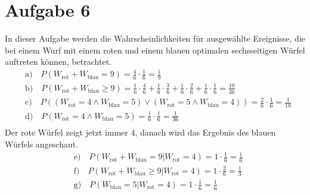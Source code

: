 \documentclass[a4paper, 11pt]{article}
\begin{document}
\section*{Aufgabe 6}
In dieser Aufgabe werden die Wahrscheinlichkeiten für ausgewählte Ereignisse, die
bei einem Wurf mit einem roten und einem blauen optimalen sechsseitigen Würfel
auftreten können, betrachtet.
\begin{align*}
  &\text{a)} \quad
  P(W_\text{rot}+W_\text{blau}=9) = \frac{4}{6} \cdot \frac{1}{6} = \frac{1}{9} \\
  &\text{b)} \quad
  P(W_\text{rot}+W_\text{blau}\ge9) = \frac{1}{6} \cdot \frac{4}{6}
    +\frac{1}{6} \cdot \frac{3}{6} + \frac{1}{6} \cdot \frac{2}{6}
    +\frac{1}{6} \cdot \frac{1}{6} = \frac{10}{36} \\
  &\text{c)} \quad
  P((W_\text{rot}=4 \land W_\text{blau}=5) \lor (W_\text{rot}=5 \land W_\text{blau}=4))
    = \frac{2}{6} \cdot \frac{1}{6} = \frac{1}{18}\\
  &\text{d)} \quad
  P(W_\text{rot}=4 \land W_\text{blau}=5) = \frac{1}{6} \cdot \frac{1}{6}
    = \frac{1}{36}\\
\end{align*}
Der rote Würfel zeigt jetzt immer 4, danach wird das Ergebnis des blauen Würfels
angeschaut.
\begin{align*}
  &\text{e)} \quad
  P(W_\text{rot}+W_\text{blau}=9 | W_\text{rot}=4) = 1 \cdot \frac{1}{6} = \frac{1}{6}\\
  &\text{f)} \quad
  P(W_\text{rot}+W_\text{blau}\ge9 | W_\text{rot}=4) = 1 \cdot \frac{2}{6} = \frac{1}{3}\\
  &\text{g)} \quad
  P(W_\text{blau}=5 | W_\text{rot}=4) = 1 \cdot \frac{1}{6} = \frac{1}{6}
\end{align*}
\end{document}
